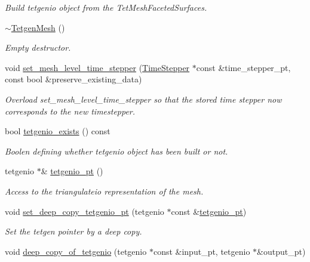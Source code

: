 \begin{DoxyCompactItemize}
\begin{DoxyCompactList}\small\item\em Build tetgenio object from the Tet\+Mesh\+Faceted\+Surfaces. \end{DoxyCompactList}\item 
\hyperlink{classoomph_1_1TetgenMesh_a9a83c64b6481463161f6eb87f347ee9e}{$\sim$\+Tetgen\+Mesh} ()
\begin{DoxyCompactList}\small\item\em Empty destructor. \end{DoxyCompactList}\item 
void \hyperlink{classoomph_1_1TetgenMesh_a9c0441ea7404e7ea404979955ffbb5dd}{set\+\_\+mesh\+\_\+level\+\_\+time\+\_\+stepper} (\hyperlink{classoomph_1_1TimeStepper}{Time\+Stepper} $\ast$const \&time\+\_\+stepper\+\_\+pt, const bool \&preserve\+\_\+existing\+\_\+data)
\begin{DoxyCompactList}\small\item\em Overload set\+\_\+mesh\+\_\+level\+\_\+time\+\_\+stepper so that the stored time stepper now corresponds to the new timestepper. \end{DoxyCompactList}\item 
bool \hyperlink{classoomph_1_1TetgenMesh_aeab19209f141e65511a52f195d89d6ac}{tetgenio\+\_\+exists} () const
\begin{DoxyCompactList}\small\item\em Boolen defining whether tetgenio object has been built or not. \end{DoxyCompactList}\item 
tetgenio $\ast$\& \hyperlink{classoomph_1_1TetgenMesh_a47071bb8a8c0df965a5e013f0a8fb1ba}{tetgenio\+\_\+pt} ()
\begin{DoxyCompactList}\small\item\em Access to the triangulateio representation of the mesh. \end{DoxyCompactList}\item 
void \hyperlink{classoomph_1_1TetgenMesh_a8758320eb646d20b578414c35145f0d7}{set\+\_\+deep\+\_\+copy\+\_\+tetgenio\+\_\+pt} (tetgenio $\ast$const \&\hyperlink{classoomph_1_1TetgenMesh_a47071bb8a8c0df965a5e013f0a8fb1ba}{tetgenio\+\_\+pt})
\begin{DoxyCompactList}\small\item\em Set the tetgen pointer by a deep copy. \end{DoxyCompactList}\item 
void \hyperlink{classoomph_1_1TetgenMesh_a93e764a63a21a93d4a2548058eb1a7c4}{deep\+\_\+copy\+\_\+of\+\_\+tetgenio} (tetgenio $\ast$const \&input\+\_\+pt, tetgenio $\ast$\&output\+\_\+pt)
\end{DoxyCompactItemize}
